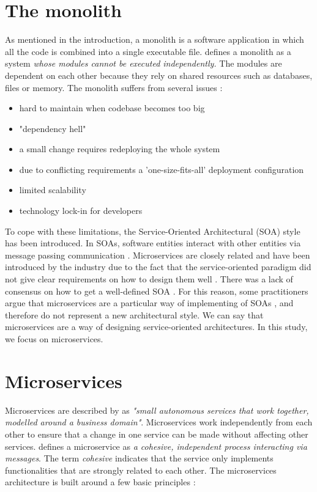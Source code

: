 \section{The monolith}
As mentioned in the introduction, a monolith is a software application in which all the code is combined into a single executable file. \citeauthor{dragoni2017yesterday} \cite{dragoni2017yesterday} defines a monolith as a system \textit{whose modules cannot be executed independently.} The modules are dependent on each other because they rely on shared resources such as databases, files or memory. The monolith suffers from several issues \cite{dragoni2017yesterday}:

\begin{itemize}
    \item hard to maintain when codebase becomes too big
    \item "dependency hell"
    \item a small change requires redeploying the whole system
    \item due to conflicting requirements a 'one-size-fits-all' deployment configuration
    \item limited scalability
    \item technology lock-in for developers
\end{itemize}

To cope with these limitations, the Service-Oriented Architectural (SOA) style has been introduced. In SOAs, software entities interact with other entities via message passing communication \cite{dragoni2017microservices}. Microservices are closely related and have been introduced by the industry due to the fact that the service-oriented paradigm did not give clear requirements on how to design them well \cite{dragoni2017yesterday}. There was a lack of consensus on how to get a well-defined SOA \cite{newman2015building}. For this reason,  some practitioners argue that microservices are a particular way of implementing of SOAs \cite{zimmermann2017microservices}, and therefore do not represent a new architectural style. We can say that microservices are a way of designing service-oriented architectures. In this study, we focus on microservices.

\section{Microservices}\label{s:microservice_principles}
Microservices are described by \citeauthor{newman2015building} \cite{newman2015building} as \textit{"small autonomous services that work together, modelled around a business domain"}. Microservices work independently from each other to ensure that a change in one service can be made without affecting other services. \citeauthor{dragoni2017yesterday} \cite{dragoni2017microservices} defines a microservice as \textit{a cohesive, independent process interacting via messages}. The term \textit{cohesive} indicates that the service only implements functionalities that are strongly related to each other. The microservices architecture is built around a few basic principles \cite{dragoni2017microservices}:

